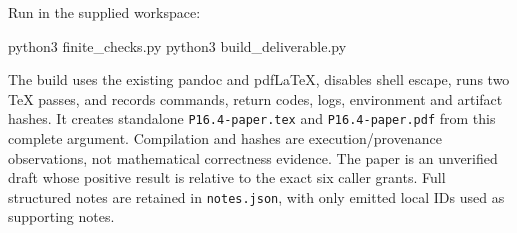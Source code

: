 \documentclass[
  11pt,
]{article}
\newenvironment{Shaded}{}{}
\newcommand{\ExtensionTok}[1]{#1}
\newcommand{\NormalTok}[1]{#1}
\begin{document}
Run in the supplied workspace:

\begin{Shaded}
\begin{Highlighting}[]
\ExtensionTok{python3}\NormalTok{ finite\_checks.py}
\ExtensionTok{python3}\NormalTok{ build\_deliverable.py}
\end{Highlighting}
\end{Shaded}

The build uses the existing pandoc and pdfLaTeX, disables shell escape,
runs two TeX passes, and records commands, return codes, logs,
environment and artifact hashes. It creates standalone
\texttt{P16.4-paper.tex} and \texttt{P16.4-paper.pdf} from this complete
argument. Compilation and hashes are execution/provenance observations,
not mathematical correctness evidence. The paper is an unverified draft
whose positive result is relative to the exact six caller grants. Full
structured notes are retained in \texttt{notes.json}, with only emitted
local IDs used as supporting notes.
\end{document}
